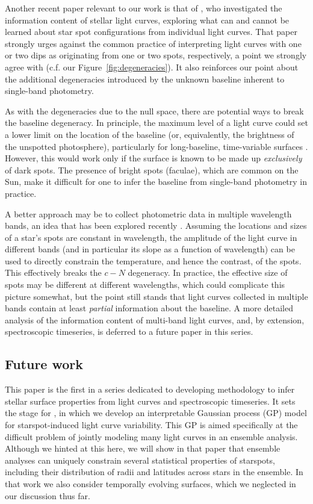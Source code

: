 \documentclass[modern]{aastex62}
\begin{document}
Another recent paper relevant to our work is that of \citet{Basri2020}, who
investigated the information content of stellar light curves, exploring what
can and cannot be learned about star spot configurations from individual
light curves. That paper strongly urges against the common practice
of interpreting
light curves with one or two dips as originating from one or two spots,
respectively, a point we strongly agree with (c.f. our Figure~\ref{fig:degeneracies}).
It also reinforces our point about the additional degeneracies introduced
by the unknown baseline inherent to single-band photometry.
%


As with the degeneracies due to the null space, there are potential ways
to break the baseline degeneracy.
%
In principle, the maximum level of a light curve could set a lower limit on
the location of the baseline (or, equivalently, the brightness of the
unspotted photosphere), particularly for long-baseline, time-variable
surfaces \citep{Basri2018}. However, this would work only if the surface is
known to be made up \emph{exclusively} of dark spots. The presence of bright
spots (faculae), which are common on the Sun, make it difficult
for one to infer the baseline from single-band photometry in practice.

A better approach may be to collect photometric data in
multiple wavelength bands, an idea that has
been explored recently \citep[e.g.,][]{Gully2017,Guo2018}. Assuming the
locations and sizes of a star's spots are constant in wavelength, the amplitude
of the light curve in different bands (and in particular its slope as a function
of wavelength) can be used to directly constrain the
temperature, and hence the contrast, of the spots. This effectively breaks the
$c-N$ degeneracy. In practice, the effective size of spots may be different
at different wavelengths, which could complicate this picture somewhat, but
the point still stands that light curves collected in multiple bands
contain at least \emph{partial} information about the baseline.
%
A more detailed analysis of the information content of multi-band light curves,
and, by extension, spectroscopic timeseries, is deferred to a future paper
in this series.

\subsection{Future work}

This paper is the first in a series dedicated to developing
methodology to infer stellar surface properties from light curves
and spectroscopic timeseries. It sets the stage for \citet{PaperII},
in which we develop an interpretable Gaussian process (GP) model for
starspot-induced light curve variability. This GP is aimed specifically
at the difficult problem of jointly modeling many light curves
in an ensemble analysis. Although we hinted at this here, we will show
in that paper that ensemble analyses can uniquely constrain several
statistical properties of starspots, including their distribution
of radii and latitudes across stars in the ensemble. In that work
we also consider temporally evolving surfaces, which we neglected
in our discussion thus far.
\end{document}
